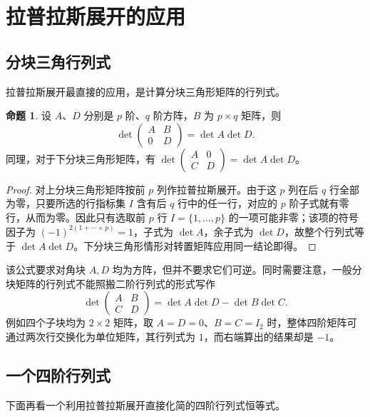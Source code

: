 \documentclass[UTF8, fontset=fandol, a4paper, 12pt]{ctexart}
\theoremstyle{definition}
\newtheorem{proposition}[theorem]{命题}
\begin{document}
\section{拉普拉斯展开的应用}

\subsection{分块三角行列式}

拉普拉斯展开最直接的应用，是计算分块三角形矩阵的行列式。

\begin{proposition}
设 $A$、$D$ 分别是 $p$ 阶、$q$ 阶方阵，$B$ 为 $p\times q$ 矩阵，则
\[
 \det\begin{pmatrix}A&B\\0&D\end{pmatrix}=\det A\det D.
\]
同理，对于下分块三角形矩阵，有 $\det\begin{pmatrix}A&0\\C&D\end{pmatrix}=\det A\det D$。
\end{proposition}
\begin{proof}
对上分块三角形矩阵按前 $p$ 列作拉普拉斯展开。由于这 $p$ 列在后 $q$ 行全部为零，只要所选的行指标集 $I$ 含有后 $q$ 行中的任一行，对应的 $p$ 阶子式就有零行，从而为零。因此只有选取前 $p$ 行 $I=\{1,\ldots,p\}$ 的一项可能非零；该项的符号因子为 $(-1)^{2(1+\cdots+p)}=1$，子式为 $\det A$，余子式为 $\det D$，故整个行列式等于 $\det A\det D$。下分块三角形情形对转置矩阵应用同一结论即得。
\end{proof}

该公式要求对角块 $A,D$ 均为方阵，但并不要求它们可逆。同时需要注意，一般分块矩阵的行列式不能照搬二阶行列式的形式写作
\[
 \det\begin{pmatrix}A&B\\C&D\end{pmatrix}
 =\det A\det D-\det B\det C.
\]
例如四个子块均为 $2\times2$ 矩阵，取 $A=D=0$、$B=C=I_2$ 时，整体四阶矩阵可通过两次行交换化为单位矩阵，其行列式为 $1$，而右端算出的结果却是 $-1$。

\subsection{一个四阶行列式}

下面再看一个利用拉普拉斯展开直接化简的四阶行列式恒等式。
\end{document}
